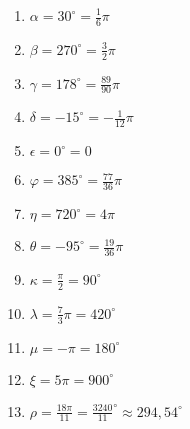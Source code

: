 \begin{Answer}[ref=bogenmassA1]
	\begin{enumerate}[label=\alph*)]
		\item \(\alpha=30^\circ=\frac{1}{6}\pi\)
		\item \(\beta=270^\circ=\frac{3}{2}\pi\)
		\item \(\gamma=178^\circ=\frac{89}{90}\pi\)
		\item \(\delta=-15^\circ=-\frac{1}{12}\pi\)
		\item \(\epsilon=0^\circ=0\)
		\item \(\varphi=385^\circ=\frac{77}{36}\pi\)
		\item \(\eta=720^\circ=4\pi\)
		\item \(\theta=-95^\circ=\frac{19}{36}\pi\)
		\item \(\kappa=\frac{\pi}{2}=90^\circ\)
		\item \(\lambda=\frac{7}{3}\pi=420^\circ\)
		\item \(\mu=-\pi=180^\circ\)
		\item \(\xi=5\pi=900^\circ\)
		\item \(\rho=\frac{18\pi}{11}=\frac{3240}{11}^\circ\approx294,54^\circ\)	
	\end{enumerate}
\end{Answer}